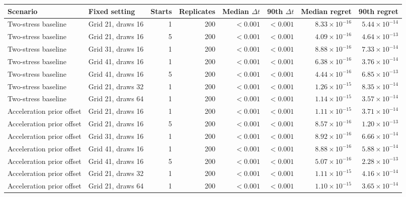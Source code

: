 \begin{tabular}{llrrrrrr}
\toprule
Scenario & Fixed setting & Starts & Replicates & Median $\Delta t$ & 90th $\Delta t$ & Median regret & 90th regret \\
\midrule
Two-stress baseline & Grid 21, draws 16 & 1 & 200 & $<0.001$ & $<0.001$ & $8.33\times10^{-16}$ & $5.44\times10^{-14}$ \\
Two-stress baseline & Grid 21, draws 16 & 5 & 200 & $<0.001$ & $<0.001$ & $4.09\times10^{-16}$ & $4.64\times10^{-13}$ \\
Two-stress baseline & Grid 31, draws 16 & 1 & 200 & $<0.001$ & $<0.001$ & $8.88\times10^{-16}$ & $7.33\times10^{-14}$ \\
Two-stress baseline & Grid 41, draws 16 & 1 & 200 & $<0.001$ & $<0.001$ & $6.38\times10^{-16}$ & $3.76\times10^{-14}$ \\
Two-stress baseline & Grid 41, draws 16 & 5 & 200 & $<0.001$ & $<0.001$ & $4.44\times10^{-16}$ & $6.85\times10^{-13}$ \\
Two-stress baseline & Grid 21, draws 32 & 1 & 200 & $<0.001$ & $<0.001$ & $1.26\times10^{-15}$ & $8.35\times10^{-14}$ \\
Two-stress baseline & Grid 21, draws 64 & 1 & 200 & $<0.001$ & $<0.001$ & $1.14\times10^{-15}$ & $3.57\times10^{-14}$ \\
Acceleration prior offset & Grid 21, draws 16 & 1 & 200 & $<0.001$ & $<0.001$ & $1.11\times10^{-15}$ & $3.71\times10^{-14}$ \\
Acceleration prior offset & Grid 21, draws 16 & 5 & 200 & $<0.001$ & $<0.001$ & $8.57\times10^{-16}$ & $1.20\times10^{-13}$ \\
Acceleration prior offset & Grid 31, draws 16 & 1 & 200 & $<0.001$ & $<0.001$ & $8.92\times10^{-16}$ & $6.66\times10^{-14}$ \\
Acceleration prior offset & Grid 41, draws 16 & 1 & 200 & $<0.001$ & $<0.001$ & $8.88\times10^{-16}$ & $5.88\times10^{-14}$ \\
Acceleration prior offset & Grid 41, draws 16 & 5 & 200 & $<0.001$ & $<0.001$ & $5.07\times10^{-16}$ & $2.28\times10^{-13}$ \\
Acceleration prior offset & Grid 21, draws 32 & 1 & 200 & $<0.001$ & $<0.001$ & $1.11\times10^{-15}$ & $4.16\times10^{-14}$ \\
Acceleration prior offset & Grid 21, draws 64 & 1 & 200 & $<0.001$ & $<0.001$ & $1.10\times10^{-15}$ & $3.65\times10^{-14}$ \\
\bottomrule
\end{tabular}
